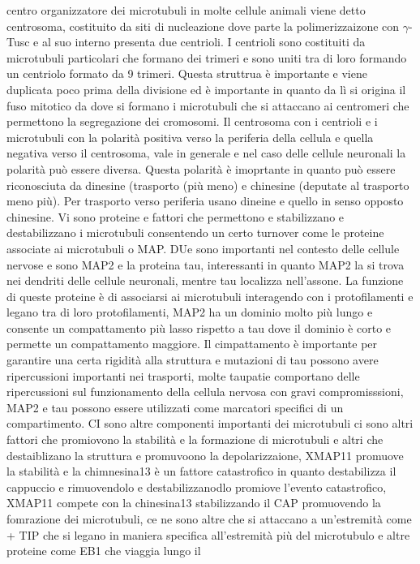centro organizzatore dei microtubuli in molte cellule animali viene detto centrosoma, costituito da siti di nucleazione dove parte la polimerizzaizone con $\gamma$-Tusc e al suo interno
presenta due centrioli. I centrioli sono costituiti da microtubuli particolari che formano dei trimeri e sono uniti tra di loro formando un centriolo formato da 9 trimeri. Questa
struttrua \`e importante e viene duplicata poco prima della divisione ed \`e importante in quanto da l\`i si origina il fuso mitotico da dove si formano i microtubuli che si attaccano ai
centromeri che permettono la segregazione dei cromosomi. Il centrosoma con i centrioli e i microtubuli con la polarit\`a positiva verso la periferia della cellula e quella negativa verso 
il centrosoma, vale in generale e nel caso delle cellule neuronali la polarit\`a pu\`o essere diversa. Questa polarit\`a \`e imoprtante in quanto pu\`o essere riconosciuta da dinesine 
(trasporto (pi\`u meno) e chinesine (deputate al trasporto meno pi\`u). Per trasporto verso periferia usano dineine e quello in senso opposto chinesine. Vi sono proteine e fattori che
permettono e stabilizzano e destabilizzano i microtubuli consentendo un certo turnover come le proteine associate ai microtubuli o MAP. DUe sono importanti nel contesto delle cellule
nervose e sono MAP2 e la proteina tau, interessanti in quanto MAP2 la si trova nei dendriti delle cellule neuronali, mentre tau localizza nell'assone. La funzione di queste proteine 
\`e di associarsi ai microtubuli interagendo con i protofilamenti e legano tra di loro protofilamenti, MAP2 ha un dominio molto pi\`u lungo e consente un compattamento pi\`u lasso 
rispetto a tau dove il dominio \`e corto e permette un compattamento maggiore. Il cimpattamento \`e importante per garantire una certa rigidit\`a alla struttura e mutazioni di tau 
possono avere ripercussioni importanti nei trasporti, molte taupatie comportano delle ripercussioni sul funzionamento della cellula nervosa con gravi compromisssioni, MAP2 e tau possono
essere utilizzati come marcatori specifici di un compartimento. CI sono altre componenti importanti dei microtubuli ci sono altri fattori che promiovono la stabilit\`a e la formazione di 
microtubuli e altri che destaiblizano la struttura e promuvoono la depolarizzaione, XMAP11 promuove la stabilit\`a e la chimnesina13 \`e un fattore catastrofico in quanto destabilizza
il cappuccio e rimuovendolo e destabilizzanodlo promiove l'evento catastrofico, XMAP11 compete con la chinesina13 stabilizzando il CAP promuovendo la fomrazione dei microtubuli, ce ne
sono altre che si attaccano a un'estremit\`a come  + TIP che si legano in maniera specifica all'estremit\`a pi\`u del microtubulo e altre proteine come EB1 che viaggia lungo il 
